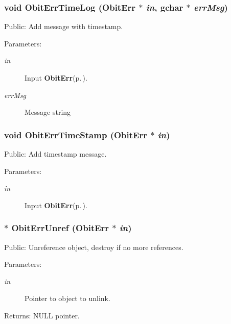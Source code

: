 \subsubsection{\setlength{\rightskip}{0pt plus 5cm}void Obit\-Err\-Time\-Log ({\bf Obit\-Err} $\ast$ {\em in}, gchar $\ast$ {\em err\-Msg})}\label{ObitErr_8h_a25}


Public: Add message with timestamp. 

\begin{Desc}
\item[Parameters:]
\begin{description}
\item[{\em in}]Input {\bf Obit\-Err}{\rm (p.\,\pageref{structObitErr})}. \item[{\em err\-Msg}]Message string \end{description}
\end{Desc}
\subsubsection{\setlength{\rightskip}{0pt plus 5cm}void Obit\-Err\-Time\-Stamp ({\bf Obit\-Err} $\ast$ {\em in})}\label{ObitErr_8h_a24}


Public: Add timestamp message. 

\begin{Desc}
\item[Parameters:]
\begin{description}
\item[{\em in}]Input {\bf Obit\-Err}{\rm (p.\,\pageref{structObitErr})}. \end{description}
\end{Desc}
\subsubsection{$\ast$ Obit\-Err\-Unref ({\bf Obit\-Err} $\ast$ {\em in})}\label{ObitErr_8h_a18}


Public: Unreference object, destroy if no more references. 

\begin{Desc}
\item[Parameters:]
\begin{description}
\item[{\em in}]Pointer to object to unlink. \end{description}
\end{Desc}
\begin{Desc}
\item[Returns:]NULL pointer. \end{Desc}
